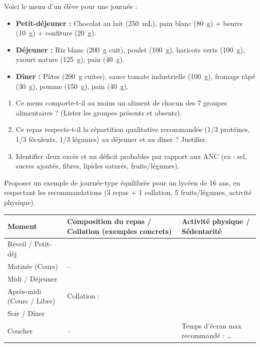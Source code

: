\documentclass[11pt]{article}
\begin{document}
\begin{exercice}
Voici le menu d'un élève pour une journée :
\begin{itemize}
    \item \textbf{Petit-déjeuner :} Chocolat au lait (\SI{250}{mL}), pain blanc (\SI{80}{g}) + beurre (\SI{10}{g}) + confiture (\SI{20}{g}).
    \item \textbf{Déjeuner :} Riz blanc (\SI{200}{g} cuit), poulet (\SI{100}{g}), haricots verts (\SI{100}{g}), yaourt nature (\SI{125}{g}), pain (\SI{40}{g}).
    \item \textbf{Dîner :} Pâtes (\SI{200}{g} cuites), sauce tomate industrielle (\SI{100}{g}), fromage râpé (\SI{30}{g}), pomme (\SI{150}{g}), pain (\SI{40}{g}).
\end{itemize}
\begin{enumerate}
    \item Ce menu comporte-t-il au moins un aliment de chacun des 7 groupes alimentaires ? (Lister les groupes présents et absents).
    \item Ce repas respecte-t-il la répartition qualitative recommandée (1/3 protéines, 1/3 féculents, 1/3 légumes) au déjeuner et au dîner ? Justifier.
    \item Identifier deux excès et un déficit probables par rapport aux ANC (ex : sel, sucres ajoutés, fibres, lipides saturés, fruits/légumes).
\end{enumerate}
\end{exercice}

\begin{exercice}
Proposer un exemple de journée-type équilibrée pour un lycéen de 16 ans, en respectant les recommandations (3 repas + 1 collation, 5 fruits/légumes, activité physique).
\begin{tabular}{|p{2.5cm}|p{6cm}|p{5cm}|}
\hline
\textbf{Moment} & \textbf{Composition du repas / Collation (exemples concrets)} & \textbf{Activité physique / Sédentarité} \\
\hline
Réveil / Petit-déj &  &  \\
\hline
Matinée (Cours) & -- &  \\
\hline
Midi / Déjeuner &  &  \\
\hline
Après-midi (Cours / Libre) & Collation : &  \\
\hline
Soir / Dîner &  &  \\
\hline
Coucher & -- & Temps d'écran max recommandé : \ldots \\
\hline
\end{tabular}
\end{exercice}
\end{document}
